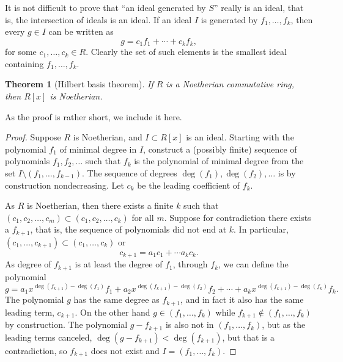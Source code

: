 \documentclass[12pt,openany]{book}
\theoremstyle{plain}
\newtheorem{thm}{Theorem}[section]
\theoremstyle{remark}
\theoremstyle{definition}
\theoremstyle{exercise}
\theoremstyle{example}
\begin{document}
It is not difficult to prove that ``an ideal generated by $S$'' really is
an ideal, that is, the intersection of ideals is an ideal.
If an ideal $I$ is generated by $f_1,\ldots,f_k$, then every
$g \in I$ can be written as
\begin{equation*}
g = c_1 f_1 + \cdots + c_k f_k,
\end{equation*}
for some $c_1,\ldots,c_k \in R$.  Clearly the set of such elements is
the smallest ideal containing $f_1,\ldots,f_k$.

\begin{thm}[Hilbert basis theorem] \label{thm:hilbertbasis}
%
If $R$ is a Noetherian commutative ring, then $R[x]$ is Noetherian.
\end{thm}

As the proof is rather short, we include it here.

\begin{proof}
Suppose $R$ is Noetherian, and
$I \subset R[x]$ is an ideal.
Starting with the polynomial $f_1$ of minimal degree in $I$,
construct a (possibly finite) sequence of polynomials $f_1,f_2,\ldots$
such that $f_k$ is the polynomial of minimal degree
from the set $I \setminus (f_1,\ldots,f_{k-1})$.
The sequence of degrees $\deg(f_1),\deg(f_2),\ldots$ is by construction
nondecreasing.
Let $c_k$ be the leading coefficient of $f_k$.

As $R$ is Noetherian, then there exists a finite $k$ such
that $(c_1,c_2,\ldots,c_m) \subset (c_1,c_2,\ldots,c_k)$ for all $m$.
Suppose for contradiction there exists a $f_{k+1}$, that is, the sequence
of polynomials
did not end at $k$.  In particular,
$(c_1,\ldots,c_{k+1}) \subset (c_1,\ldots,c_k)$ or
\begin{equation*}
c_{k+1} = a_1 c_1 + \cdots a_k c_k .
\end{equation*}
As degree of $f_{k+1}$ is at least the degree of $f_1$, through $f_k$,
we can define the polynomial
\begin{equation*}
g =
a_1 x^{\deg(f_{k+1})-\deg(f_1)} f_1
+
a_2 x^{\deg(f_{k+1})-\deg(f_2)} f_2
+
\cdots
+
a_k x^{\deg(f_{k+1})-\deg(f_k)} f_k .
\end{equation*}
The polynomial $g$ has the same degree as $f_{k+1}$,
and in fact it also has the same leading term, 
$c_{k+1}$.  On the other hand $g \in (f_1,\ldots,f_{k})$ while
$f_{k+1} \notin (f_1,\ldots,f_k)$ by construction.  The polynomial
$g-f_{k+1}$ is also not in 
$(f_1,\ldots,f_k)$, but as the leading terms canceled,
$\deg(g-f_{k+1}) < \deg(f_{k+1})$, but that is a contradiction, so $f_{k+1}$
does not exist and
$I = (f_1,\ldots,f_k)$.
\end{proof}
\end{document}
